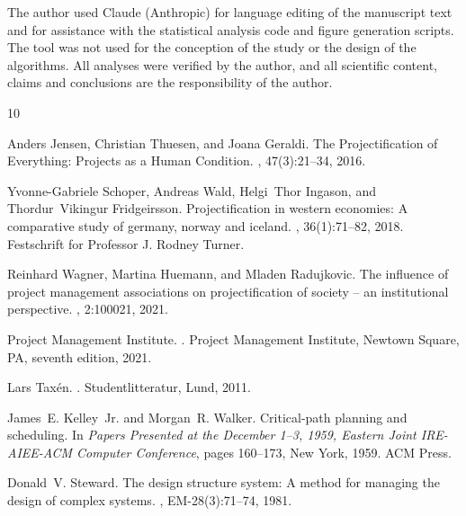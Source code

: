 \documentclass[11pt,a4paper]{article}
\begin{document}
The author used Claude (Anthropic) for language editing of the manuscript text and for assistance with the statistical analysis code and figure generation scripts. The tool was not used for the conception of the study or the design of the algorithms. All analyses were verified by the author, and all scientific content, claims and conclusions are the responsibility of the author.


%
%

\begin{thebibliography}{10}

Anders Jensen, Christian Thuesen, and Joana Geraldi.
\newblock The {Projectification} of {Everything}: {Projects} as a {Human}
  {Condition}.
, 47(3):21--34, 2016.

Yvonne-Gabriele Schoper, Andreas Wald, Helgi~Thor Ingason, and Thordur~Vikingur
  Fridgeirsson.
\newblock Projectification in western economies: A comparative study of
  germany, norway and iceland.
, 36(1):71--82,
  2018.
\newblock Festschrift for Professor J. Rodney Turner.

Reinhard Wagner, Martina Huemann, and Mladen Radujkovic.
\newblock The influence of project management associations on projectification
  of society – an institutional perspective.
, 2:100021, 2021.

{Project Management Institute}.
.
\newblock Project Management Institute, Newtown Square, PA, seventh edition,
  2021.

Lars Tax{\'e}n.
.
\newblock Studentlitteratur, Lund, 2011.

James~E. Kelley~Jr. and Morgan~R. Walker.
\newblock Critical-path planning and scheduling.
\newblock In {\em Papers Presented at the December 1--3, 1959, Eastern Joint
  IRE-AIEE-ACM Computer Conference}, pages 160--173, New York, 1959. ACM Press.

Donald~V. Steward.
\newblock The design structure system: A method for managing the design of
  complex systems.
,
  EM-28(3):71--74, 1981.


\end{thebibliography}
\end{document}
